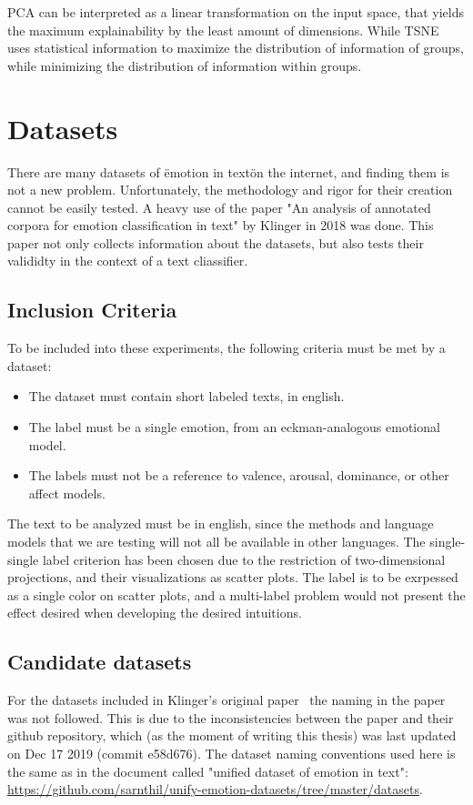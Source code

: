 PCA can be interpreted as a linear transformation on the input space, that yields the maximum explainability by the least amount of dimensions. While TSNE uses statistical information to maximize the distribution of information of groups, while minimizing the distribution of information within groups.

\section{Datasets}\label{sec:Datasets}
There are many datasets of \"emotion in text\" on the internet, and finding them is not a new problem. Unfortunately, the methodology and rigor for their creation cannot be easily tested. A heavy use of the paper "An analysis of annotated corpora for emotion classification in text" by Klinger in 2018 \cite{klinger2018analysis} was done. This paper not only collects information about the datasets, but also tests their valididty in the context of a text cliassifier.

\subsection{Inclusion Criteria}\label{sub:Inclusion Criteria}
To be included into these experiments, the following criteria must be met by a dataset:
\begin{itemize}
  \item The dataset must contain short labeled texts, in english.
  \item The label must be a single emotion, from an eckman-analogous emotional model.
  \item The labels must not be a reference to valence, arousal, dominance, or other affect models.
\end{itemize}
The text to be analyzed must be in english, since the methods and language models that we are testing will not all be available in other languages. The single-single label criterion has been chosen due to the restriction of two-dimensional projections, and their visualizations as scatter plots. The label is to be exrpessed as a single color on scatter plots, and a multi-label problem would not present the effect desired  when developing the desired intuitions.

\subsection{Candidate datasets}\label{sub:Candidate datasets}
For the datasets included in Klinger's original paper~\cite{klinger2018analysis} the naming in the paper was not followed. This is due to the inconsistencies between the paper and their github repository, which (as the moment of writing this thesis) was last updated on Dec 17 2019 (commit e58d676). The dataset naming conventions used here is the same as in the document called "unified dataset of emotion in text": \url{https://github.com/sarnthil/unify-emotion-datasets/tree/master/datasets}.

